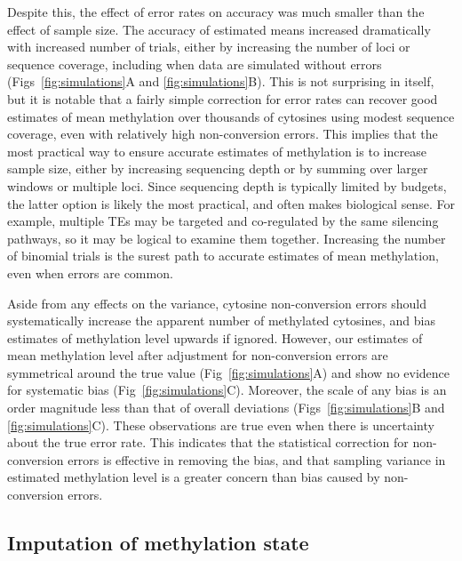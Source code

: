 \documentclass[10pt,draft,letterpaper]{article}
\begin{document}
Despite this, the effect of error rates on accuracy was much smaller than the effect of sample size.
The accuracy of estimated means increased dramatically with increased number of trials, either by increasing the number of loci or sequence coverage, including when data are simulated without errors (Figs~\ref{fig:simulations}A and \ref{fig:simulations}B).
This is not surprising in itself, but it is notable that a fairly simple correction for error rates can recover good estimates of mean methylation over thousands of cytosines using modest sequence coverage, even with relatively high non-conversion errors.
This implies that the most practical way to ensure accurate estimates of methylation is to increase sample size, either by increasing sequencing depth or by summing over larger windows or multiple loci.
Since sequencing depth is typically limited by budgets, the latter option is likely the most practical, and often makes biological sense.
For example, multiple TEs may be targeted and co-regulated by the same silencing pathways, so it may be logical to examine them together.
Increasing the number of binomial trials is the surest path to accurate estimates of mean methylation, even when errors are common.

Aside from any effects on the variance, cytosine non-conversion errors should systematically increase the apparent number of methylated cytosines, and bias estimates of methylation level upwards if ignored.
However, our estimates of mean methylation level after adjustment for non-conversion errors are symmetrical around the true value (Fig~\ref{fig:simulations}A) and show no evidence for systematic bias (Fig~\ref{fig:simulations}C).
Moreover, the scale of any bias is an order magnitude less than that of overall deviations (Figs~\ref{fig:simulations}B and \ref{fig:simulations}C).
These observations are true even when there is uncertainty about the true error rate.
This indicates that the statistical correction for non-conversion errors is effective in removing the bias, and that sampling variance in estimated methylation level is a greater concern than bias caused by non-conversion errors.

\subsection*{Imputation of methylation state}
\end{document}

